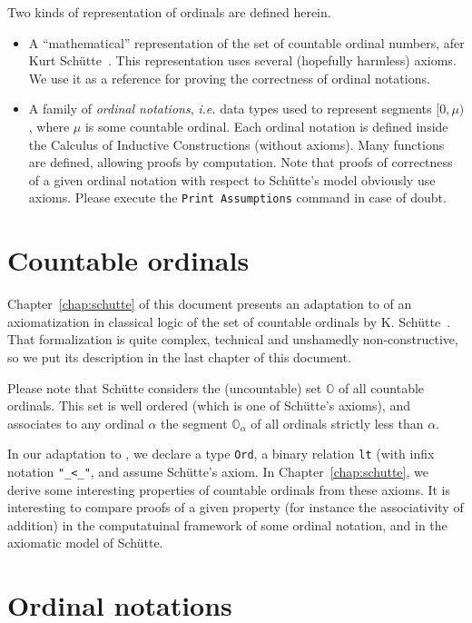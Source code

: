 \documentclass[a4paper]{book}
\begin{document}
Two kinds of representation of ordinals are defined herein.

\begin{itemize}
\item A ``mathematical'' representation of the set of countable ordinal numbers, afer Kurt Schütte~\cite{schutte}. This representation uses several (hopefully harmless) axioms. We use it as a reference for proving the correctness of ordinal notations.
\item A family of \emph{ordinal notations}, \emph{i.e.} data types used to represent segments $[0,\mu)$, where $\mu$ is some countable ordinal. Each ordinal notation is defined inside the Calculus of Inductive Constructions (without axioms). Many functions are defined, allowing proofs by computation. Note that proofs of 
correctness of a given ordinal notation with respect to Schütte's model obviously use axioms.
Please execute the \texttt{Print Assumptions} command in case of doubt.
\end{itemize}

\section{Countable ordinals}

Chapter~\ref{chap:schutte} of this document presents an adaptation to \coq{} of an axiomatization in classical logic of the set of countable ordinals by K. Schütte~\cite{schutte}. 
That formalization is quite complex, technical and unshamedly non-constructive,  so we put its description  in the last chapter of this document. 

Please note that Schütte considers the (uncountable) set $\mathbb{O}$ of all countable ordinals. This set is well ordered (which is one of Schütte's axioms), and associates to any ordinal $\alpha$ the segment $\mathbb{O}_\alpha$ of all ordinals strictly less than $\alpha$.

In our adaptation to \coq{}, we declare a type \texttt{Ord}, a binary relation \texttt{lt} (with infix notation \texttt{"\_<\_"}, and assume Schütte's axiom. In Chapter~\ref{chap:schutte},
we derive some interesting properties of countable ordinals from these axioms.
It is interesting to compare proofs of a given property (for instance the associativity of addition) in the computatuinal framework of some ordinal notation, and in the axiomatic model of Schütte.


\section{Ordinal notations}
\end{document}
